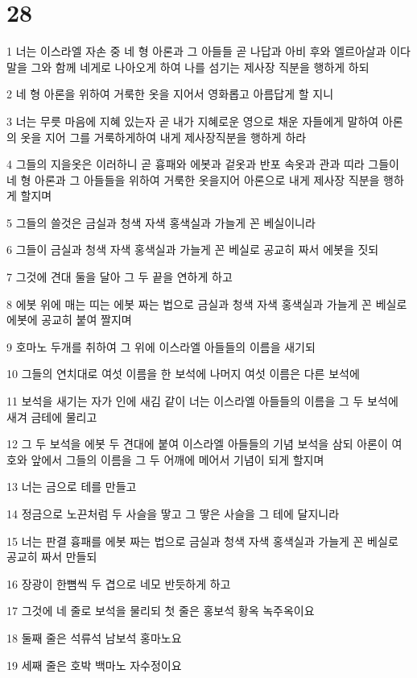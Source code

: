 \chapter{28}

\par 1 너는 이스라엘 자손 중 네 형 아론과 그 아들들 곧 나답과 아비 후와 엘르아살과 이다말을 그와 함께 네게로 나아오게 하여 나를 섬기는 제사장 직분을 행하게 하되
\par 2 네 형 아론을 위하여 거룩한 옷을 지어서 영화롭고 아름답게 할 지니
\par 3 너는 무릇 마음에 지혜 있는자 곧 내가 지혜로운 영으로 채운 자들에게 말하여 아론의 옷을 지어 그를 거룩하게하여 내게 제사장직분을 행하게 하라
\par 4 그들의 지을옷은 이러하니 곧 흉패와 에봇과 겉옷과 반포 속옷과 관과 띠라 그들이 네 형 아론과 그 아들들을 위하여 거룩한 옷을지어 아론으로 내게 제사장 직분을 행하게 할지며
\par 5 그들의 쓸것은 금실과 청색 자색 홍색실과 가늘게 꼰 베실이니라
\par 6 그들이 금실과 청색 자색 홍색실과 가늘게 꼰 베실로 공교히 짜서 에봇을 짓되
\par 7 그것에 견대 둘을 달아 그 두 끝을 연하게 하고
\par 8 에봇 위에 매는 띠는 에봇 짜는 법으로 금실과 청색 자색 홍색실과 가늘게 꼰 베실로 에봇에 공교히 붙여 짤지며
\par 9 호마노 두개를 취하여 그 위에 이스라엘 아들들의 이름을 새기되
\par 10 그들의 연치대로 여섯 이름을 한 보석에 나머지 여섯 이름은 다른 보석에
\par 11 보석을 새기는 자가 인에 새김 같이 너는 이스라엘 아들들의 이름을 그 두 보석에 새겨 금테에 물리고
\par 12 그 두 보석을 에봇 두 견대에 붙여 이스라엘 아들들의 기념 보석을 삼되 아론이 여호와 앞에서 그들의 이름을 그 두 어깨에 메어서 기념이 되게 할지며
\par 13 너는 금으로 테를 만들고
\par 14 정금으로 노끈처럼 두 사슬을 땋고 그 땋은 사슬을 그 테에 달지니라
\par 15 너는 판결 흉패를 에봇 짜는 법으로 금실과 청색 자색 홍색실과 가늘게 꼰 베실로 공교히 짜서 만들되
\par 16 장광이 한뼘씩 두 겹으로 네모 반듯하게 하고
\par 17 그것에 네 줄로 보석을 물리되 첫 줄은 홍보석 황옥 녹주옥이요
\par 18 둘째 줄은 석류석 남보석 홍마노요
\par 19 세째 줄은 호박 백마노 자수정이요
